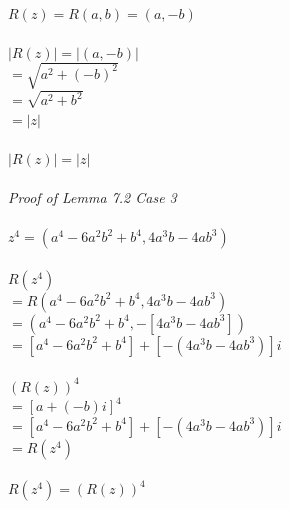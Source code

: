 \documentclass{article}
\begin{document}
\\$R(z)= R(a,b)= (a,-b)$
\\
\\$|R(z)| = |(a,-b)|$
\\$= \sqrt{a^2+(-b)^2}$
\\$= \sqrt{a^2 + b^2}$
\\$= |z|$
\\
\\$|R(z)| = |z|$
\\
\\\textit{Proof of Lemma 7.2 Case 3}
\\
\\$z^4 = (a^4-6a^2b^2+b^4, 4a^3b-4ab^3)$
\\
\\$R(z^4)$
\\$= R(a^4-6a^2b^2+b^4, 4a^3b-4ab^3)$
\\$= (a^4-6a^2b^2+b^4, -[4a^3b-4ab^3])$
\\$= [a^4-6a^2b^2+b^4]+[-(4a^3b-4ab^3)]i$
\\
\\$(R(z))^4$
\\$= [a+(-b)i]^4$
\\$= [a^4-6a^2b^2+b^4]+[-(4a^3b-4ab^3)]i$
\\$= R(z^4)$
\\
\\$R(z^4) = (R(z))^4$
\\
\\
\end{document}
